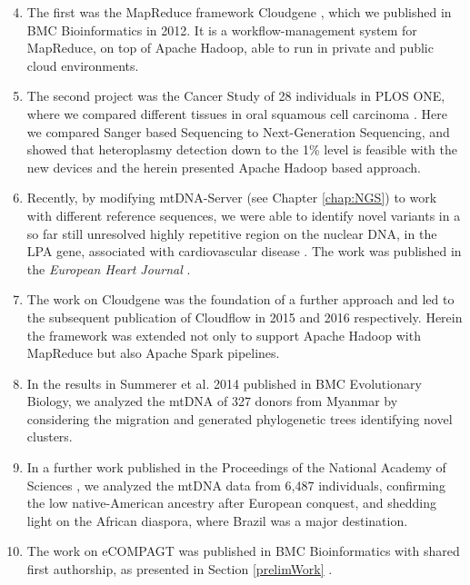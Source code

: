 \begin{enumerate}
\setcounter{enumi}{3}
\item The first was the MapReduce framework Cloudgene \cite{Schonherr2012}, which we published in BMC Bioinformatics in 2012. It is a workflow-management system for MapReduce, on top of Apache Hadoop, able to run in private and public cloud environments.
\item The second project was the Cancer Study of 28 individuals in PLOS ONE, where we compared different tissues in oral squamous cell carcinoma \cite{Kloss-Brandstatter2015}. Here we compared Sanger based Sequencing to Next-Generation Sequencing, and showed that heteroplasmy detection down to the 1\% level is feasible with the new devices and the herein presented Apache Hadoop based approach. 

\item Recently, by modifying mtDNA-Server (see Chapter \ref{chap:NGS}) to work with different reference sequences, we were able to identify novel variants in a so far still unresolved highly repetitive region on the nuclear DNA, in the LPA gene, associated with cardiovascular disease \cite{Kronenberg2014}. The work was published in the \textit{European Heart Journal} \cite{Coassin2017}. 

\item The work on Cloudgene was the foundation of a further approach and led to the subsequent publication of Cloudflow in 2015 \cite{Forer2015} 
and 2016 \cite{Forer2016} respectively. Herein the framework was extended not only to support Apache Hadoop with MapReduce but also Apache Spark pipelines. 
\item
In the results in Summerer et al. 2014 \cite{Summerer2014} published in BMC Evolutionary Biology, we analyzed the mtDNA of 327 donors from Myanmar by considering the migration and generated phylogenetic trees identifying novel clusters. 
\item
In a further work published in the Proceedings of the National Academy of Sciences \cite{Kehdy2015}, we analyzed the mtDNA data from 6,487 individuals, confirming the low native-American ancestry after European conquest, and shedding light on the African diaspora, where Brazil was a major destination.

\item The work on eCOMPAGT was published in BMC Bioinformatics with shared first authorship, as presented in Section \ref{prelimWork} \cite{Schoenherr2009,Weissensteiner2010}.


\end{enumerate}
